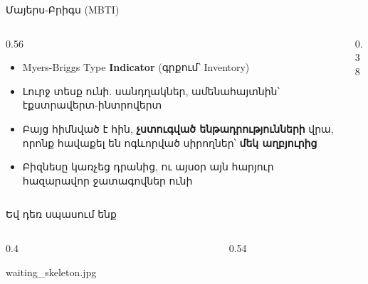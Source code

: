 \begin{frame}{Մայերս-Բրիգս (MBTI)}
  \begin{columns}[c]
    \begin{column}{0.56\textwidth}
      \begin{itemize}
        \item Myers-Briggs Type \textbf{Indicator} (գրքում՝ Inventory)
        \item Լուրջ տեսք ունի. սանդղակներ, ամենահայտնին՝ էքստրավերտ-ինտրովերտ
        \item<2-> Բայց հիմնված է հին, \textbf{չստուգված ենթադրությունների} վրա, որոնք հավաքել են ոգևորված սիրողներ՝ \textbf{մեկ աղբյուրից}
        \item<3-> Բիզնեսը կառչեց դրանից, ու այսօր այն հարյուր հազարավոր ջատագովներ ունի
      \end{itemize}
    \end{column}
    \begin{column}{0.38\textwidth}
      \centering
    \end{column}
  \end{columns}
\end{frame}

\begin{frame}{Եվ դեռ սպասում ենք}
  \begin{columns}[c]
    \begin{column}{0.4\textwidth}
      \centering
      \begin{meme}[4.4cm]{waiting_skeleton.jpg}
      \end{meme}
    \end{column}
    \begin{column}{0.54\textwidth}
    \end{column}
  \end{columns}
\end{frame}

